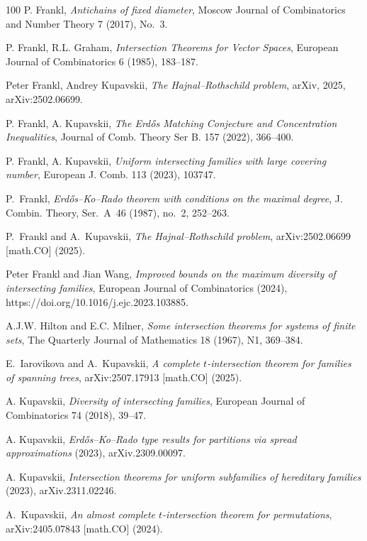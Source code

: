 \documentclass[11pt]{extarticle}
\numberwithin{equation}{section} %
\theoremstyle{plain}
\theoremstyle{definition}
\begin{document}
\begin{thebibliography}{100}
 P. Frankl, {\it Antichains of fixed diameter}, Moscow Journal of Combinatorics and Number Theory 7 (2017), No.~3.

 P. Frankl, R.L. Graham, {\it Intersection Theorems for Vector Spaces}, European Journal of Combinatorics 6 (1985), 183--187.

 Peter Frankl, Andrey Kupavskii, \textit{The Hajnal--Rothschild problem}, arXiv, 2025, arXiv:2502.06699.

 P. Frankl, A. Kupavskii,  {\it The Erd\H os Matching Conjecture and Concentration Inequalities}, Journal of Comb. Theory Ser B. 157 (2022), 366--400.

 P. Frankl, A. Kupavskii, {\it Uniform intersecting families with large covering number}, European J. Comb. 113 (2023), 103747.

P.~Frankl, {\it Erd\H{o}s--Ko--Rado theorem with conditions on the maximal degree},
J. Combin. Theory, Ser.~A~46 (1987), no.~2, 252--263.

P.~Frankl and A.~Kupavskii, {\it The Hajnal--Rothschild problem},
arXiv:2502.06699 [math.CO] (2025).

 Peter Frankl and Jian Wang, {\it Improved bounds on the maximum diversity of intersecting families},  European Journal of Combinatorics (2024), https://doi.org/10.1016/j.ejc.2023.103885.

 A.J.W. Hilton and E.C. Milner, \textit{Some intersection theorems for systems of finite sets}, The Quarterly Journal of Mathematics 18 (1967), N1, 369--384.

E.~Iarovikova and A.~Kupavskii, {\it A complete $t$-intersection theorem for families of spanning trees},
arXiv:2507.17913 [math.CO] (2025).

 A. Kupavskii, {\it Diversity of intersecting families}, European Journal of Combinatorics 74 (2018), 39--47.

 A. Kupavskii, {\it Erd\H os--Ko--Rado type results for partitions via spread approximations} (2023), arXiv.2309.00097.

 A. Kupavskii, {\it Intersection theorems for uniform subfamilies of hereditary families} (2023), arXiv.2311.02246.

A.~Kupavskii, {\it An almost complete $t$-intersection theorem for permutations},
arXiv:2405.07843 [math.CO] (2024).


\end{thebibliography}
\end{document}
